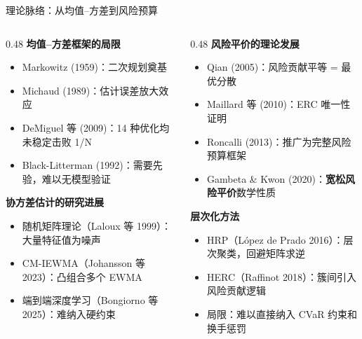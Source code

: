 \documentclass[aspectratio=169,11pt]{beamer}
\begin{document}
\begin{frame}{理论脉络：从均值–方差到风险预算}
  \begin{columns}[T]
    \begin{column}{0.48\textwidth}
      \textbf{均值–方差框架的局限}
      \begin{itemize}
        \item Markowitz (1959)：二次规划奠基
        \item Michaud (1989)：估计误差放大效应
        \item DeMiguel 等 (2009)：14 种优化均未稳定击败 1/N
        \item Black-Litterman (1992)：需要先验，难以无模型验证
      \end{itemize}
      \vspace{0.6em}
      \textbf{协方差估计的研究进展}
      \begin{itemize}
        \item 随机矩阵理论（Laloux 等 1999）：大量特征值为噪声
        \item CM-IEWMA（Johansson 等 2023）：凸组合多个 EWMA
        \item 端到端深度学习（Bongiorno 等 2025）：难纳入硬约束
      \end{itemize}
    \end{column}
    \begin{column}{0.48\textwidth}
      \textbf{风险平价的理论发展}
      \begin{itemize}
        \item Qian (2005)：风险贡献平等 = 最优分散
        \item Maillard 等 (2010)：ERC 唯一性证明
        \item Roncalli (2013)：推广为完整风险预算框架
        \item Gambeta \& Kwon (2020)：\textbf{宽松风险平价}数学性质
      \end{itemize}
      \vspace{0.6em}
      \textbf{层次化方法}
      \begin{itemize}
        \item HRP（López de Prado 2016）：层次聚类，回避矩阵求逆
        \item HERC（Raffinot 2018）：簇间引入风险贡献逻辑
        \item \alert{局限}：难以直接纳入 CVaR 约束和换手惩罚
      \end{itemize}
    \end{column}
  \end{columns}
\end{frame}
\end{document}
